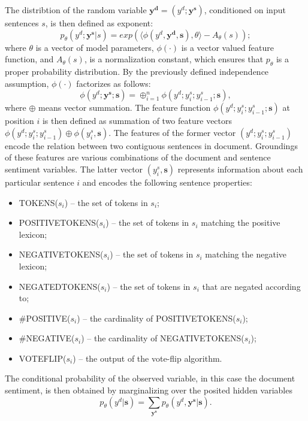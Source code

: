 \documentclass[a4paper,11pt]{article}
\begin{document}
The distribtion of the random variable $\mathbf{y^d} = (y^d; \mathbf{y^s})$,
conditioned on input sentences $s$, is then defined as exponent:
\begin{equation}
  p_\theta(y^d; \mathbf{y^s}|s) = exp(\langle\phi(y^d, \mathbf{y^{d}},
  \mathbf{s}), \theta\rangle - A_\theta(s));
\end{equation}
where $\theta$ is a vector of model parameters, $\phi(\cdot)$ is a vector
valued feature function, and $A_\theta(s)$, is a normalization constant, which
ensures that $p_\theta$ is a proper probability distribution.  By the
previously defined independence assumption, $\phi(\cdot)$ factorizes as
follows:
\begin{equation}
  \phi(y^d; \mathbf{y^s}; \mathbf{s}) = \oplus_{i=1}^n\phi(y^d; y^s_i;
  y^s_{i-1}; \mathbf{s}),
\end{equation}
where $\oplus$ means vector summation.  The feature function $\phi(y^d; y^s_i;
y^s_{i-1}; \mathbf{s})$ at position $i$ is then defined as summation of two
feature vectors $\phi(y^d; y^s_i; y^s_{i-1}) \oplus \phi(y_i^s, \mathbf{s})$.
The features of the former vector $(y^d; y^s_i; y^s_{i-1})$ encode the
relation between two contiguous sentences in document.  Groundings of these
features are various combinations of the document and sentence sentiment
variables.  The latter vector $(y_i^s, \mathbf{s})$ represents information
about each particular sentence $i$ and encodes the following sentence
properties:
\begin{itemize}
  \item TOKENS($s_i$) -- the set of tokens in $s_i$;
  \item POSITIVETOKENS($s_i$) -- the set of tokens in $s_i$ matching the
    positive lexicon;
  \item NEGATIVETOKENS($s_i$) -- the set of tokens in $s_i$ matching the
    negative lexicon;
  \item NEGATEDTOKENS($s_i$) -- the set of tokens in $s_i$ that are negated according to;
  \item \#POSITIVE($s_i$) -- the cardinality of POSITIVETOKENS($s_i$);
  \item \#NEGATIVE($s_i$) -- the cardinality of NEGATIVETOKENS($s_i$);
  \item VOTEFLIP($s_i$) -- the output of the vote-flip algorithm.
\end{itemize}
The conditional probability of the observed variable, in this case the
document sentiment, is then obtained by marginalizing over the posited hidden
variables
\begin{equation}
  p_\theta(y^d|\mathbf{s}) = \sum_{\mathbf{y^s}}{p_\theta(y^d,
    \mathbf{y^s}|\mathbf{s})}.
\end{equation}
\end{document}
